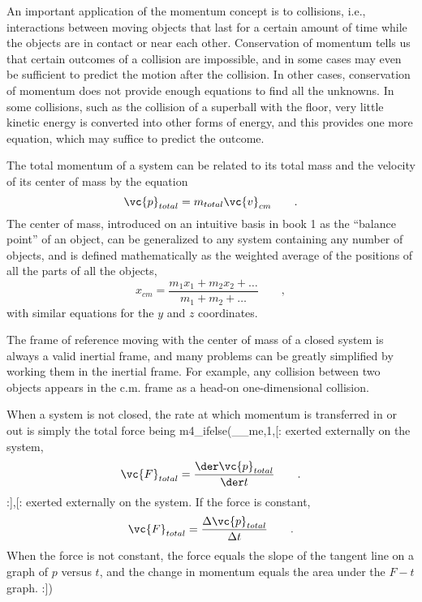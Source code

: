 \begin{summary}
\begin{summarytext}
An important application of the momentum concept is to
collisions, i.e., interactions between moving objects that
last for a certain amount of time while the objects are in
contact or near each other. Conservation of momentum tells
us that certain outcomes of a collision are impossible, and
in some cases may even be sufficient to predict the motion
after the collision. In other cases, conservation of
momentum does not provide enough equations to find all the
unknowns. In some collisions, such as the collision of a
superball with the floor, very little kinetic energy is
converted into other forms of energy, and this provides one
more equation, which may suffice to predict the outcome.

The total momentum of a system can be related to its total
mass and the velocity of its center of mass by the equation
\begin{equation*}
                \vc{p}_{total}  =  m_{total} \vc{v}_{cm}   \qquad   .
\end{equation*}
The center of mass, introduced on an intuitive basis in book
1 as the ``balance point'' of an object, can be generalized
to any system containing any number of objects, and is
defined mathematically as the weighted average of the
positions of all the parts of all the objects,
\begin{equation*}
                x_{cm}  =   \frac{m_1x_1+m_2x_2+\ldots}{m_1+m_2+\ldots}  \qquad   ,
\end{equation*}
with similar equations for the $y$ and $z$ coordinates.

The frame of reference moving with the center of mass of a
closed system is always a valid inertial frame, and many
problems can be greatly simplified by working them in the
inertial frame. For example, any collision between two
objects appears in the c.m. frame as a head-on one-dimensional collision.

When a system is not closed, the rate at which momentum is
transferred in or out is simply the total force being
m4_ifelse(__me,1,[:%
exerted externally on the system,
\begin{equation*}
                \vc{F}_{total}  =  \frac{\der \vc{p}_{total}}{\der t}   \qquad   .
\end{equation*}
:],[:%
exerted externally on the system.
If the force is constant,
\begin{equation*}
                \vc{F}_{total}  =  \frac{\Delta \vc{p}_{total}}{\Delta t}   \qquad   .
\end{equation*}
When the force is not constant, the force equals the slope
of the tangent line on a graph of $p$ versus $t$, and the
change in momentum equals the area under the $F-t$ graph.
:])

\end{summarytext}

\end{summary}
